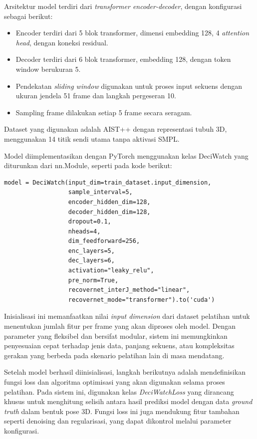 Arsitektur model terdiri dari \textit{transformer encoder-decoder}, dengan konfigurasi sebagai berikut:

\begin{itemize}
    \item Encoder terdiri dari 5 blok transformer, dimensi embedding 128, 4 \textit{attention head}, dengan koneksi residual.
    \item Decoder terdiri dari 6 blok transformer, embedding 128, dengan token window berukuran 5.
    \item Pendekatan \textit{sliding window} digunakan untuk proses input sekuens dengan ukuran jendela 51 frame dan langkah pergeseran 10.
    \item Sampling frame dilakukan setiap 5 frame secara seragam.
\end{itemize}

Dataset yang digunakan adalah AIST++ dengan representasi tubuh 3D, menggunakan 14 titik sendi utama tanpa aktivasi SMPL.

Model diimplementasikan dengan PyTorch menggunakan kelas {DeciWatch} yang diturunkan dari {nn.Module}, seperti pada kode berikut:

\begin{lstlisting}[style=plainbox, caption={Model {DeciWatch}},captionpos=t, label={lst:deciwatch_model}]
model = DeciWatch(input_dim=train_dataset.input_dimension,
                  sample_interval=5,
                  encoder_hidden_dim=128,
                  decoder_hidden_dim=128,
                  dropout=0.1,
                  nheads=4,
                  dim_feedforward=256,
                  enc_layers=5,
                  dec_layers=6,
                  activation="leaky_relu",
                  pre_norm=True,
                  recovernet_interJ_method="linear",
                  recovernet_mode="transformer").to('cuda')
\end{lstlisting}


Inisialisasi ini memanfaatkan nilai \textit{input dimension} dari dataset pelatihan untuk menentukan jumlah fitur per frame yang akan diproses oleh model. Dengan parameter yang fleksibel dan bersifat modular, sistem ini memungkinkan penyesuaian cepat terhadap jenis data, panjang sekuens, atau kompleksitas gerakan yang berbeda pada skenario pelatihan lain di masa mendatang.

Setelah model berhasil diinisialisasi, langkah berikutnya adalah mendefinisikan fungsi loss dan algoritma optimisasi yang akan digunakan selama proses pelatihan. Pada sistem ini, digunakan kelas \textit{DeciWatchLoss} yang dirancang khusus untuk menghitung selisih antara hasil prediksi model dengan data \textit{ground truth} dalam bentuk pose 3D. Fungsi loss ini juga mendukung fitur tambahan seperti denoising dan regularisasi, yang dapat dikontrol melalui parameter konfigurasi.

